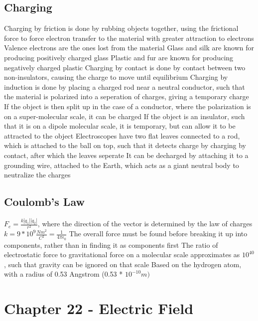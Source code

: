 \documentclass[11 pt, twoside]{article}
\newenvironment{outline*}
{
	\begin{outline}[enumerate]
	}
	{\end{outline}
}
\begin{document}
\subsection{Charging}
\begin{outline*}
\1 Charging by friction is done by rubbing objects together, using the frictional force to force electron transfer to the material with greater attraction to electrons
\2 Valence electrons are the ones lost from the material
\2 Glass and silk are known for producing positively charged glass
\2 Plastic and fur are known for producing negatively charged plastic
\1 Charging by contact is done by contact between two non-insulators, causing the charge to move until equilibrium
\1 Charging by induction is done by placing a charged rod near a neutral conductor, such that the material is polarized into a seperation of charges, giving a temporary charge
\2 If the object is then split up in the case of a conductor, where the polarization is on a super-molecular scale, it can be charged
\2 If the object is an insulator, such that it is on a dipole molecular scale, it is temporary, but can allow it to be attracted to the object
\1 Electroscopes have two flat leaves connected to a rod, which is attached to the ball on top, such that it detects charge by charging by contact, after which the leaves seperate
\2 It can be decharged by attaching it to a grounding wire, attached to the Earth, which acts as a giant neutral body to neutralize the charges
\end{outline*}

\subsection{Coulomb's Law}
\begin{outline*}
\1 $F_e = \frac{k|q_1||q_2|}{r^2}$, where the direction of the vector is determined by the law of charges
\2 $k = 9 * 10^9 \frac{Nm^2}{C^2} = \frac{1}{4\pi\epsilon_0}$
\2 The overall force must be found before breaking it up into components, rather than in finding it as components first
\1 The ratio of electrostatic force to gravitational force on a molecular scale approximates as $10^{40}$, such that gravity can be ignored on that scale
\2 Based on the hydrogen atom, with a radius of 0.53 Angstrom (0.53 * $10^{-10} m)$
\end{outline*}

\section{Chapter 22 - Electric Field}
\end{document}
